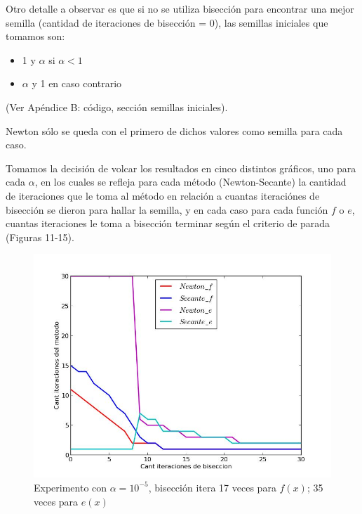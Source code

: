 Otro detalle a observar es que si no se utiliza bisección para encontrar una mejor semilla (cantidad de iteraciones de bisección = 0), las semillas iniciales que tomamos son:

\begin{itemize}
	\item 1 y $\alpha$ si $\alpha < 1$ 
	\item $\alpha$ y 1 en caso contrario
\end{itemize}

(Ver Apéndice B: código, sección semillas iniciales).

Newton sólo se queda con el primero de dichos valores como semilla para cada caso.

Tomamos la decisión de volcar los resultados en cinco distintos gráficos, uno para cada $\alpha$, en los cuales se refleja para cada método (Newton-Secante) la cantidad de iteraciones que le toma al método en relación a cuantas iteraciónes de bisección se dieron para hallar la semilla, y en cada caso para cada función $f$ o $e$, cuantas iteraciones le toma a bisección terminar según el criterio de parada (Figuras 11-15).

\begin{figure}[!h]
	\begin{center}
		  \includegraphics[scale=0.5]{../Imagenes/exp4/experimento_biseccion_1.jpg}
		  \caption{Experimento con $\alpha = 10^{-5}$, bisección itera 17 veces para $f(x)$; 35 veces para $e(x)$}
		  \label{fig:contra1}
	\end{center}
\end{figure}
\FloatBarrier

